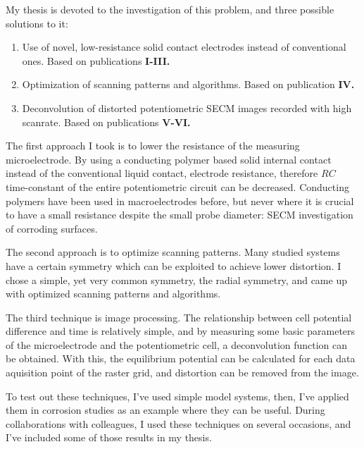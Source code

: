 My thesis is devoted to the investigation of this problem, and three possible solutions to it:

\begin{enumerate}
\item Use of novel, low-resistance solid contact electrodes instead of conventional ones.
Based on publications \textbf{\color{blue}I-III.}
\item Optimization of scanning patterns and algorithms.
Based on publication \textbf{\color{blue}IV.}
\item Deconvolution of distorted potentiometric SECM images recorded with high scanrate.
Based on publications \textbf{\color{blue}V-VI.}
\end{enumerate}

The first approach I took is to lower the resistance of the measuring microelectrode.
By using a conducting polymer based solid internal contact instead of the conventional liquid contact, electrode resistance, therefore $RC$ time-constant of the entire potentiometric circuit can be decreased.
Conducting polymers have been used in macroelectrodes before, but never where it is crucial to have a small resistance despite the small probe diameter: SECM investigation of corroding surfaces.

The second approach is to optimize scanning patterns.
Many studied systems have a certain symmetry which can be exploited to achieve lower distortion.
I chose a simple, yet very common symmetry, the radial symmetry, and came up with optimized scanning patterns and algorithms.

The third technique is image processing.
The relationship between cell potential difference and time is relatively simple, and by measuring some basic parameters of the microelectrode and the potentiometric cell, a deconvolution function can be obtained.
With this, the equilibrium potential can be calculated for each data aquisition point of the raster grid, and distortion can be removed from the image.

To test out these techniques, I've used simple model systems, then, I've applied them in corrosion studies as an example where they can be useful.
During collaborations with colleagues, I used these techniques on several occasions, and I've included some of those results in my thesis.
